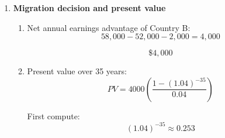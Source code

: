 \documentclass[12pt]{article}
\begin{document}
\begin{enumerate}[label=\textbf{Question \arabic*.}]
\begin{enumerate}[label=(\alph*)]
    Demand becomes:
    \[
    W=40-0.01N_n+0.005(200)
    \]

    \[
    W=40-0.01N_n+1=41-0.01N_n
    \]

    Set equal to supply:
    \[
    41-0.01N_n = 10+0.02N_n
    \]

    \[
    31=0.03N_n
    \]

    \[
    N_n=1033.33
    \]

    Wage:
    \[
    W=10+0.02(1033.33)=30.67
    \]

    \[
    \boxed{N_n=1033.33,\quad W=30.67}
    \]

    \item When \(N_i=300\):

    Demand becomes:
    \[
    W=40-0.01N_n+0.005(300)
    \]

    \[
    W=40-0.01N_n+1.5=41.5-0.01N_n
    \]

    Set equal to supply:
    \[
    41.5-0.01N_n = 10+0.02N_n
    \]

    \[
    31.5=0.03N_n
    \]

    \[
    N_n=1050
    \]

    Wage:
    \[
    W=10+0.02(1050)=31
    \]

    \[
    \boxed{N_n=1050,\quad W=31}
    \]

    \item Interpretation:

    Since immigrant labour enters positively in the native-born demand equation, immigrants are complements to native-born workers. As immigration rises, both native-born employment and wages increase.
\end{enumerate}


\item \textbf{Migration decision and present value}

\begin{enumerate}[label=(\alph*)]
    \item Net annual earnings advantage of Country B:
    \[
    58{,}000 - 52{,}000 - 2{,}000 = 4{,}000
    \]

    \[
    \boxed{\$4{,}000}
    \]

    \item Present value over 35 years:
    \[
    PV = 4000\left(\frac{1-(1.04)^{-35}}{0.04}\right)
    \]

    First compute:
    \[
    (1.04)^{-35}\approx 0.253
    \]


\end{enumerate}
\end{enumerate}
\end{document}
